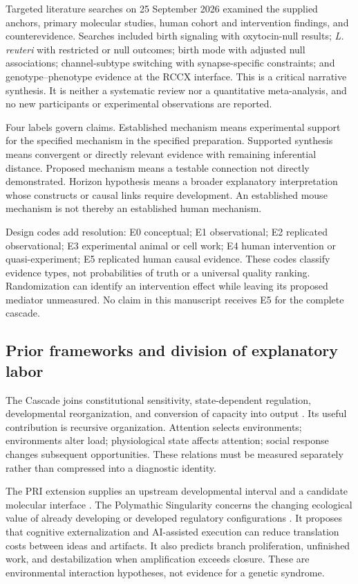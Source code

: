 Targeted literature searches on 25 September 2026 examined the supplied anchors, primary molecular studies, human cohort and intervention findings, and counterevidence. Searches included birth signaling with oxytocin-null results; \emph{L. reuteri} with restricted or null outcomes; birth mode with adjusted null associations; channel-subtype switching with synapse-specific constraints; and genotype–phenotype evidence at the RCCX interface. This is a critical narrative synthesis. It is neither a systematic review nor a quantitative meta-analysis, and no new participants or experimental observations are reported.

Four labels govern claims. Established mechanism means experimental support for the specified mechanism in the specified preparation. Supported synthesis means convergent or directly relevant evidence with remaining inferential distance. Proposed mechanism means a testable connection not directly demonstrated. Horizon hypothesis means a broader explanatory interpretation whose constructs or causal links require development. An established mouse mechanism is not thereby an established human mechanism.

Design codes add resolution: E0 conceptual; E1 observational; E2 replicated observational; E3 experimental animal or cell work; E4 human intervention or quasi-experiment; E5 replicated human causal evidence. These codes classify evidence types, not probabilities of truth or a universal quality ranking. Randomization can identify an intervention effect while leaving its proposed mediator unmeasured. No claim in this manuscript receives E5 for the complete cascade.


\subsection{Prior frameworks and division of explanatory labor}

The Cascade joins constitutional sensitivity, state-dependent regulation, developmental reorganization, and conversion of capacity into output \cite{projP1}. Its useful contribution is recursive organization. Attention selects environments; environments alter load; physiological state affects attention; social response changes subsequent opportunities. These relations must be measured separately rather than compressed into a diagnostic identity.

The PRI extension supplies an upstream developmental interval and a candidate molecular interface \cite{projP3}. The Polymathic Singularity concerns the changing ecological value of already developing or developed regulatory configurations \cite{projP2}. It proposes that cognitive externalization and AI-assisted execution can reduce translation costs between ideas and artifacts. It also predicts branch proliferation, unfinished work, and destabilization when amplification exceeds closure. These are environmental interaction hypotheses, not evidence for a genetic syndrome.

